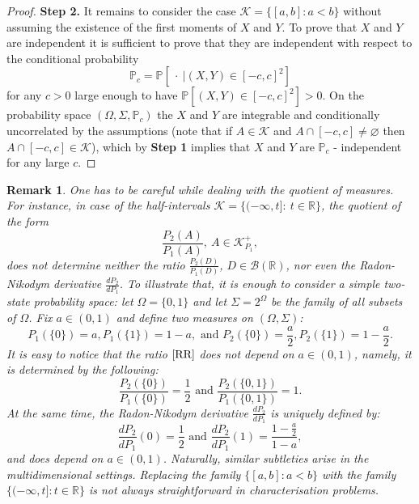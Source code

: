 \documentclass[sn-mathphys,Numbered,11pt]{sn-jnl}%
\theoremstyle{thmstyleone}%
\newtheorem{remark}{Remark}%
\newcommand{\R}{\mathbb{R}}
\newcommand{\PP}{\mathbb{P}}
\newcommand{\B}{\mathcal{B}(\R)}
\newcommand{\KK}{\mathcal{K}}
\begin{document}
\begin{proof}
\textbf{Step 2.} It remains to consider the case $\KK=\{[a,b]\colon a<b\}$ without assuming the existence of the first moments of $X$ and $Y$. To prove that $X$ and $Y$ are independent it is sufficient to prove that they are independent with respect to the conditional probability
$$\PP_{c}=\PP[\ \cdot\ |(X,Y)\in [-c,c]^2]$$
for any $c>0$ large enough to  have $\PP[(X,Y)\in [-c,c]^2]>0$.  On the probability space $(\Omega,\Sigma,\PP_c)$ the $X$ and $Y$ are integrable and conditionally uncorrelated by the assumptions (note that if $A\in \KK$ and $A\cap[-c,c]\neq\varnothing$ then $A\cap[-c,c]\in\KK$), which by \textbf{Step 1} implies that $X$ and $Y$ are $\PP_c$ - independent for any large $c$. \end{proof}
\bigskip
\begin{remark}
One has to be careful while dealing with the quotient of measures. %
For instance, in case of the half-intervals $\KK=\{(-\infty,t]\colon\ t\in\R\}$, the quotient of the form
\begin{equation}\label{RR}
\frac{P_2(A)}{P_1(A)},\  A\in \KK^+_{P_1},
\end{equation} 
does not determine neither the ratio $\frac{P_2(D)}{P_1(D)}$, $D\in\mathcal{B}(\R)$, nor even the Radon-Nikodym  derivative $\frac{dP_2}{dP_1}$. To  illustrate that, it is enough to consider a simple two-state probability space: let $\Omega=\{0,1\}$ and let $\Sigma=2^{\Omega}$ be the family of all subsets of $\Omega$. Fix $a\in (0,1)$ and define two measures on $(\Omega,\Sigma)$:
$$ P_1(\{0\})=a, P_1(\{1\})=1-a,\mbox{ and } P_2(\{0\})=\frac{a}{2}, P_2(\{1\})=1-\frac{a}{2}.$$
It is easy to notice that the ratio $\eqref{RR}$ does not depend on $a\in(0,1)$, namely, it is determined by the following:
$$\frac{P_2(\{0\})}{P_1(\{0\})}=\frac{1}{2}\mbox{ and }\frac{P_2(\{0,1\})}{P_1(\{0,1\})}=1.$$
 At the same time, the Radon-Nikodym derivative $\frac{dP_2}{dP_1}$ is uniquely defined by:
$$\frac{dP_2}{dP_1}(0)=\frac12\mbox{ and }\frac{dP_2}{dP_1}(1)=\frac{1-\frac{a}{2}}{1-a},$$
and does depend on $a\in (0,1)$.  Naturally, similar subtleties  arise in the multidimensional settings.  Replacing the family $\{[a,b]\colon a<b\}$ with the family $\{(-\infty,t]\colon t\in\R\}$ is not always straightforward  in  characterisation problems. 
\end{remark}
\end{document}
